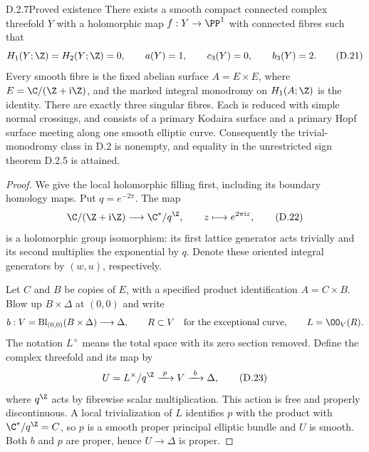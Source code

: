\begin{idstatement}{D.2.7}{Proved existence}
\label{st:D.2.7}
There exists a smooth compact connected complex threefold $Y$
with a holomorphic map $f:Y\to\PP^1$ with connected fibres such
that
\[
 H_1(Y;\Z)=H_2(Y;\Z)=0,\qquad
 a(Y)=1,\qquad c_3(Y)=0,\qquad b_3(Y)=2.
\tag{D.21}
\]
Every smooth fibre is the fixed abelian surface
$A=E\times E$, where $E=\C/(\Z+\mathrm i\Z)$, and the marked
integral monodromy on $H_1(A;\Z)$ is the identity. There are
exactly three singular fibres. Each is reduced with simple
normal crossings, and consists of a primary Kodaira surface
and a primary Hopf surface meeting along one smooth elliptic
curve. Consequently the trivial-monodromy class in D.2 is
nonempty, and equality in the unrestricted sign theorem
D.2.5 is attained.
\end{idstatement}
\begin{proof}
We give the local holomorphic filling first, including its
boundary homology maps. Put $q=e^{-2\pi}$. The map
\[
 \C/(\Z+\mathrm i\Z)\longrightarrow\C^*/q^{\Z},
 \qquad z\longmapsto e^{2\pi\mathrm i z},
\tag{D.22}
\]
is a holomorphic group isomorphism: its first lattice generator
acts trivially and its second multiplies the exponential by
$q$. Denote these oriented integral generators by $(w,u)$,
respectively.

Let $C$ and $B$ be copies of $E$, with a specified product
identification $A=C\times B$. Blow up $B\times\Delta$ at
$(0,0)$ and write
\[
 b:V=\operatorname{Bl}_{(0,0)}(B\times\Delta)\longrightarrow\Delta,
 \qquad R\subset V\quad\hbox{for the exceptional curve},
 \qquad L=\OO_V(R).
\]
The notation $L^\times$ means the total space with its zero
section removed. Define the complex threefold and its map by
\[
 U=L^\times/q^{\Z}\xrightarrow{\ p\ }V\xrightarrow{\ b\ }\Delta,
\tag{D.23}
\]
where $q^{\Z}$ acts by fibrewise scalar multiplication. This
action is free and properly discontinuous. A local
trivialization of $L$ identifies $p$ with the product with
$\C^*/q^{\Z}=C$, so $p$ is a smooth proper principal elliptic
bundle and $U$ is smooth. Both $b$ and $p$ are proper, hence
$U\to\Delta$ is proper.


\end{proof}

